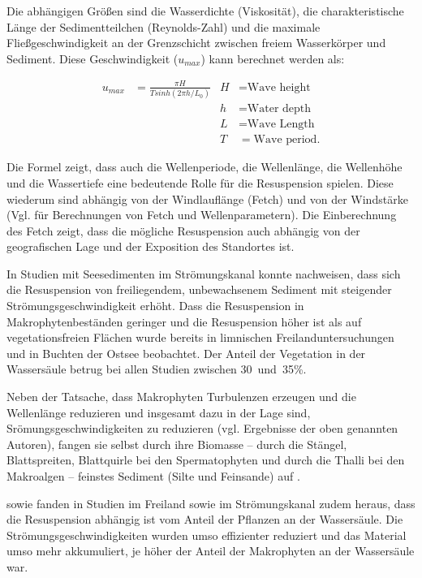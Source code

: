Die abhängigen Größen sind die Wasserdichte (Viskosität), die charakteristische Länge der Sedimentteilchen (Reynolds-Zahl) und die maximale Fließgeschwindigkeit an der Grenzschicht zwischen freiem Wasserkörper und Sediment. Diese Geschwindigkeit ($ u_{max} $) kann berechnet werden als:

\begin{align*}
u_{max} &= \frac{\pi H}{T sinh (2 \pi h / L_{0})} & H &=\text{Wave height}\\ 
        &     				                     & h &= \text{Water depth}\\
        &										 & L &= \text{Wave Length}\\
        &										 & T &= \text{Wave period}.
\end{align*}


Die Formel zeigt, dass auch die Wellenperiode, die Wellenlänge, die Wellenhöhe und die Wassertiefe eine bedeutende Rolle für die Resuspension spielen. Diese wiederum sind abhängig von der Windlauflänge (Fetch) und von der Windstärke (Vgl. \cite{laenen_1996} für Berechnungen von Fetch und Wellenparametern). Die Einberechnung des Fetch zeigt, dass die mögliche Resuspension auch abhängig von der geografischen Lage und der Exposition des Standortes ist. 

In Studien mit Seesedimenten im Strömungskanal konnte \cite{hu_2011} nachweisen, dass sich die Resuspension von freiliegendem, unbewachsenem Sediment mit steigender Strömungsgeschwindigkeit erhöht. 
Dass die Resuspension in Makrophytenbeständen geringer und die Resuspension höher ist als auf vegetationsfreien Flächen wurde bereits in limnischen Freilanduntersuchungen \citep{horppila_2003, horppila_2005} und in Buchten der Ostsee \citep{kaitaranta_2013} beobachtet. Der Anteil der Vegetation in der Wassersäule betrug bei allen Studien zwischen \unit{30 und 35}{\%}.

Neben der Tatsache, dass Makrophyten Turbulenzen erzeugen und die Wellenlänge reduzieren und insgesamt dazu in der Lage sind, Srömungsgeschwindigkeiten zu reduzieren (vgl. Ergebnisse der oben genannten Autoren), fangen sie selbst durch ihre Biomasse – durch die Stängel, Blattspreiten, Blattquirle bei den Spermatophyten und durch die Thalli bei den Makroalgen – feinstes Sediment (Silte und Feinsande) auf \citep{ma_2008}. 

\cite{ward_1984} sowie \cite{fonseca_1986} fanden in Studien im Freiland sowie im Strömungskanal zudem heraus, dass die Resuspension abhängig ist vom Anteil der Pflanzen an der Wassersäule. Die Strömungsgeschwindigkeiten wurden umso effizienter reduziert und das Material umso mehr akkumuliert, je höher der Anteil der Makrophyten an der Wassersäule war. 

